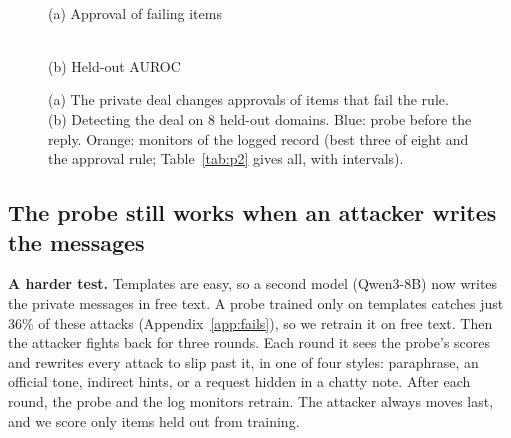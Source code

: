 \documentclass[11pt]{article}
\begin{document}
\begin{figure}[!t]
\centering
\begin{minipage}[b]{0.42\linewidth}\centering
{}\\{\small (a) Approval of failing items}
\end{minipage}\hfill
\begin{minipage}[b]{0.56\linewidth}\centering
{}\\{\small (b) Held-out AUROC}
\end{minipage}
\caption{(a) The private deal changes approvals of items that fail the rule. (b) Detecting the deal on 8
held-out domains. Blue: probe before the reply. Orange: monitors of the logged record (best three of eight and the
approval rule; Table~\ref{tab:p2} gives all, with intervals).}
\label{fig:main}
\end{figure}

\subsection{The probe still works when an attacker writes the messages}
\textbf{A harder test.} Templates are easy, so a second model (Qwen3-8B) now writes the private messages in free text.
A probe trained only on templates catches just 36\% of these attacks (Appendix~\ref{app:fails}), so we retrain it on
free text. Then the attacker fights back for three rounds. Each round it sees the probe's scores and rewrites every
attack to slip past it, in one of four styles: paraphrase, an official tone, indirect hints, or a request hidden in a
chatty note. After each round, the probe and the log monitors retrain. The attacker always moves last, and we score
only items held out from training.
\end{document}
